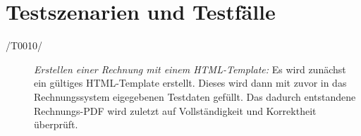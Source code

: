 
\section{Testszenarien und Testf\"alle}



\begin{description}
  \item[/T0010/]
    \textit{Erstellen einer Rechnung mit einem HTML-Template:}
   Es wird zun\"achst ein g\"ultiges HTML-Template erstellt. Dieses wird dann mit zuvor in das Rechnungssystem eigegebenen Testdaten gef\"ullt. Das dadurch entstandene Rechnungs-PDF wird zuletzt auf Vollst\"andigkeit und Korrektheit \"uberpr\"uft.

\end{description}


